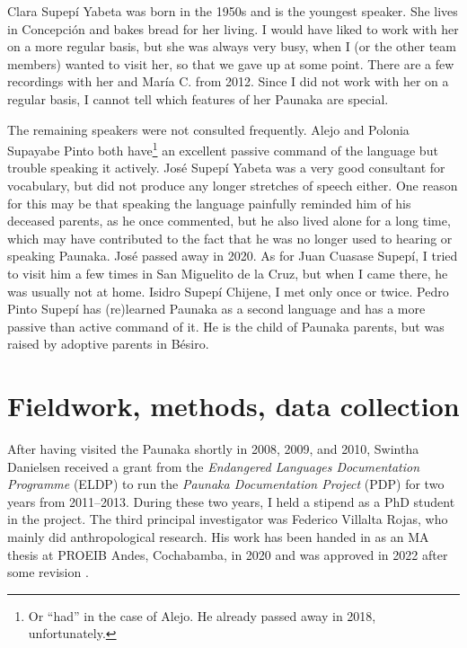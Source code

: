 Clara Supepí Yabeta was born in the 1950s and is the youngest speaker. She lives in Concepción and bakes bread for her living. I would have liked to work with her on a more regular basis, but she was always very busy, when I (or the other team members) wanted to visit her, so that we gave up at some point. There are a few recordings with her and María C. from 2012. Since I did not work with her on a regular basis, I cannot tell which features of her Paunaka are special.

The remaining speakers were not consulted frequently. Alejo and Polonia Supayabe Pinto both have\footnote{Or “had” in the case of Alejo. He already passed away in 2018, unfortunately.} an excellent passive command of the language but trouble speaking it actively. José Supepí Yabeta was a very good consultant for vocabulary, but did not produce any longer stretches of speech either. One reason for this may be that speaking the language painfully reminded him of his deceased parents, as he once commented, but he also lived alone for a long time, which may have contributed to the fact that he was no longer used to hearing or speaking Paunaka. José passed away in 2020. As for Juan Cuasase Supepí, I tried to visit him a few times in San Miguelito de la Cruz, but when I came there, he was usually not at home. Isidro Supepí Chijene, I met only once or twice. Pedro Pinto Supepí has (re)learned Paunaka as a second language and has a more passive than active command of it. He is the child of Paunaka parents, but was raised by adoptive parents in Bésiro.


\section{Fieldwork, methods, data collection}\label{sec:Fieldwork}

After having visited the Paunaka shortly in 2008, 2009, and 2010, Swintha Danielsen received a grant from the \textit{Endangered Languages Documentation Programme} (ELDP) to run the \textit{Paunaka Documentation Project} (PDP) for two years from 2011–2013. During these two years, I held a stipend as a PhD student in the project. The third principal investigator was Federico Villalta Rojas, who mainly did anthropological research. His work has been handed in as an MA thesis at PROEIB Andes, Cochabamba, in 2020 and was approved in 2022 after some revision \citep[]{Villalta2022}.

